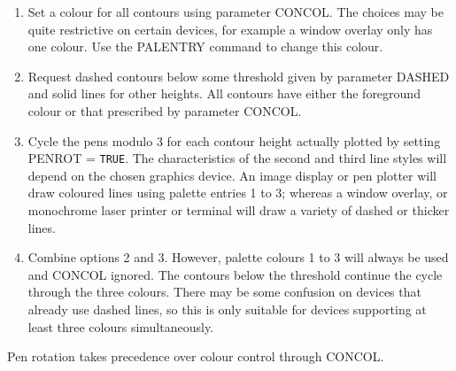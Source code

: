 \documentclass[twoside,11pt,nolof]{starlink}
\begin{document}
{{{         \begin{enumerate}
         \item Set a colour for all contours using parameter CONCOL.
               The choices may be quite restrictive on certain devices,
               for example a window overlay only has one colour.  Use
               the PALENTRY command to change this colour.
         \item Request dashed contours below some threshold given by
               parameter DASHED and solid lines for other heights.  All
               contours have either the foreground colour or that
               prescribed by parameter CONCOL.
         \item Cycle the pens modulo 3 for each contour height actually
               plotted by setting PENROT = \texttt{TRUE}.  The characteristics of
               the second and third line styles will depend on the chosen
               graphics device.  An image display or pen plotter will draw
               coloured lines using palette entries 1 to 3; whereas a
               window overlay, or monochrome laser printer or terminal
               will draw a variety of dashed or thicker lines.
         \item Combine options 2 and 3.  However, palette colours 1 to 3
               will always be used and CONCOL ignored.  The contours below
               the threshold continue the cycle through the three colours.
               There may be some confusion on devices that already use
               dashed lines, so this is only suitable for devices
               supporting at least three colours simultaneously.
         \end{enumerate}

         Pen rotation takes precedence over colour control through CONCOL.
      }
   }
}
\end{document}
